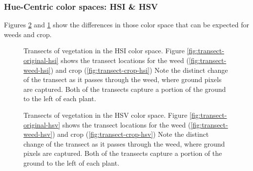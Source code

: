 \documentclass[letterpaper, notitlepage]{report}
\begin{document}
\subsubsection{Hue-Centric color spaces: HSI \& HSV}
Figures \ref{fig:transects-hsv} and \ref{fig:transects-hsi} show the differences in those color space that can be expected for weeds and crop.

\begin{figure}[!htb]
	\centering
	\hfill
	\hfill
	\caption[HSI Transects]{Transects of vegetation in the HSI color space. Figure \ref{fig:transect-original-hsi} shows the transect locations for the weed (\ref{fig:transect-weed-hsi}) and crop (\ref{fig:transect-crop-hsi}) Note the distinct change of the transect as it passes through the weed, where ground pixels are captured. Both of the transects capture a portion of the ground to the left of each plant.}
	\label{fig:transects-hsi}
\end{figure}

\begin{figure}[!htb]
	\centering
	\hfill
	\hfill
	\caption[HSV Transects]{Transects of vegetation in the HSV color space. Figure \ref{fig:transect-original-hsv} shows the transect locations for the weed (\ref{fig:transect-weed-hsv}) and crop (\ref{fig:transect-crop-hsv}) Note the distinct change of the transect as it passes through the weed, where ground pixels are captured. Both of the transects capture a portion of the ground to the left of each plant.}
	\label{fig:transects-hsv}
\end{figure}
\end{document}
